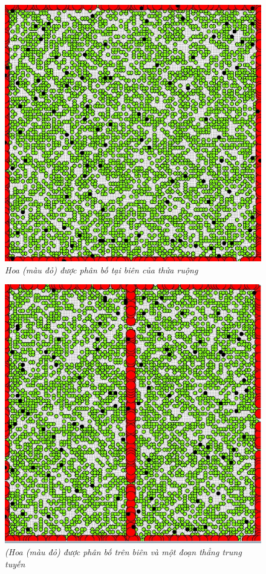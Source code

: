 \documentclass[13pt]{extreport}
\begin{document}
\begin{figure}
\begin{center}
\includegraphics[scale=0.4]{kb2}
\end{center}
\caption{\textit{Hoa (màu đỏ) được phân bố tại biên của thửa ruộng}}
\end{figure}

\begin{figure}
\begin{center}
\includegraphics[scale=0.4]{kb3}
\end{center}
\caption{\textit{(Hoa (màu đỏ) được phân bố trên biên và một đoạn thẳng trung tuyến}}
\end{figure}
\end{document}
